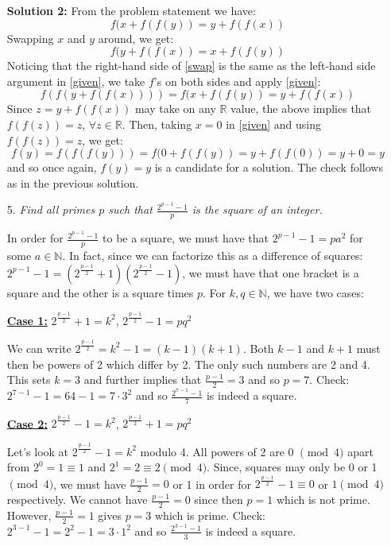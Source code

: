 \documentclass[a4paper,12pt]{article}
\begin{document}
\begin{enumerate}
  \textbf{Solution 2:}
  From the problem statement we have: 
  \begin{equation}\label{given}
    f(x+f(f(y)) = y+f(f(x))
  \end{equation} 
  Swapping $x$ and $y$ around, we get: 
  \begin{equation}\label{swap}
    f(y+f(f(x)) = x+f(f(y))
  \end{equation} 
  Noticing that the right-hand side of \eqref{swap} is the same as the left-hand side argument in \eqref{given}, we take $f$'s on both sides and apply \eqref{given}:
  \begin{equation*}
    f(f(y+f(f(x)))) = f(x+f(f(y)) = y+f(f(x))
  \end{equation*}
  Since $z = y+f(f(x))$ may take on any $\mathbb{R}$ value, the above implies that $f(f(z)) = z$, $\forall z\in \mathbb{R}$. Then, taking $x=0$ in \eqref{given} and using $f(f(z))=z$, we get:
  \begin{equation*}
    f(y) = f(f(f(y))) = f(0+f(f(y)) = y+f(f(0)) = y +0 = y
  \end{equation*} 
  and so once again, $f(y)=y$ is a candidate for a solution. The check follows as in the previous solution.
  

  \item[5.] \emph{Find all primes $p$ such that $\displaystyle \frac{2^{p-1}-1}{p}$ is the square of an integer.}
  
  In order for $\frac{2^{p-1}-1}{p}$ to be a square, we must have that $2^{p-1}-1 = p a^2$ for some $a\in \mathbb{N}$. In fact, since we can factorize this as a difference of squares:  $2^{p-1}-1 = (2^\frac{p-1}{2}+1)(2^\frac{p-1}{2}-1)$, we must have that one bracket is a square and the other is a square times $p$. For $k,q \in \mathbb{N}$, we have two cases:
  
  \underline{\textbf{Case 1:}} $2^\frac{p-1}{2}+1=k^2$, $2^\frac{p-1}{2}-1 = pq^2$

  We can write $2^\frac{p-1}{2} = k^2-1 = (k-1)(k+1)$. Both $k-1$ and $k+1$ must then be powers of 2 which differ by 2. The only such numbers are 2 and 4. This sets $k=3$ and further implies that $\frac{p-1}{2}=3$ and so $p=7$. Check: $2^{7-1}-1 = 64-1 = 7\cdot 3^2$ and so $\frac{2^{7-1}-1}{7}$ is indeed a square.
  
  \underline{\textbf{Case 2:}} $2^\frac{p-1}{2}-1=k^2$, $2^\frac{p-1}{2}+1 = pq^2$
  
  Let's look at $2^\frac{p-1}{2}-1=k^2$ modulo 4. All powers of 2 are 0 $\pmod{4}$ apart from $2^0=1 \equiv 1$ and $2^1=2 \equiv 2 \pmod{4}$. Since, squares may only be 0 or 1 $\pmod{4}$, we must have $\frac{p-1}{2} = 0$ or 1 in order for $2^\frac{p-1}{2}-1 \equiv 0$ or $1 \pmod{4}$ respectively. We cannot have $\frac{p-1}{2} = 0$ since then $p=1$ which is not prime. However, $\frac{p-1}{2} = 1$ gives $p=3$ which is prime. Check: $2^{3-1}-1 = 2^2-1 = 3\cdot 1^2$ and so $\frac{2^{3-1}-1}{3}$ is indeed a square. 
  

\end{enumerate}
\end{document}
